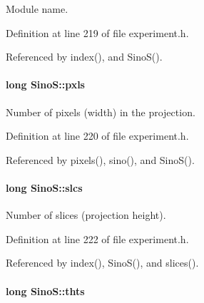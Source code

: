 Module name. 



Definition at line 219 of file experiment.h.



Referenced by index(), and SinoS().

\hypertarget{classSinoS_ac5305ea20cccd56afff6cf909f3da3d6}{
\paragraph[{pxls}]{\setlength{\rightskip}{0pt plus 5cm}long {\bf SinoS::pxls}}\hfill}
\label{classSinoS_ac5305ea20cccd56afff6cf909f3da3d6}


Number of pixels (width) in the projection. 



Definition at line 220 of file experiment.h.



Referenced by pixels(), sino(), and SinoS().

\hypertarget{classSinoS_a6e86c08cdb03820099546867a6d27814}{
\paragraph[{slcs}]{\setlength{\rightskip}{0pt plus 5cm}long {\bf SinoS::slcs}}\hfill}
\label{classSinoS_a6e86c08cdb03820099546867a6d27814}


Number of slices (projection height). 



Definition at line 222 of file experiment.h.



Referenced by index(), SinoS(), and slices().

\hypertarget{classSinoS_af08e78d111d1fc7862f783274adbd57f}{
\paragraph[{thts}]{\setlength{\rightskip}{0pt plus 5cm}long {\bf SinoS::thts}}\hfill}
\label{classSinoS_af08e78d111d1fc7862f783274adbd57f}


